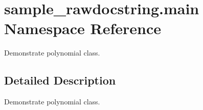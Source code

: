 \hypertarget{namespacesample__rawdocstring_1_1main}{\section{sample\-\_\-rawdocstring.\-main Namespace Reference}
\label{namespacesample__rawdocstring_1_1main}
}


Demonstrate polynomial class.  




\subsection{Detailed Description}
Demonstrate polynomial class. 